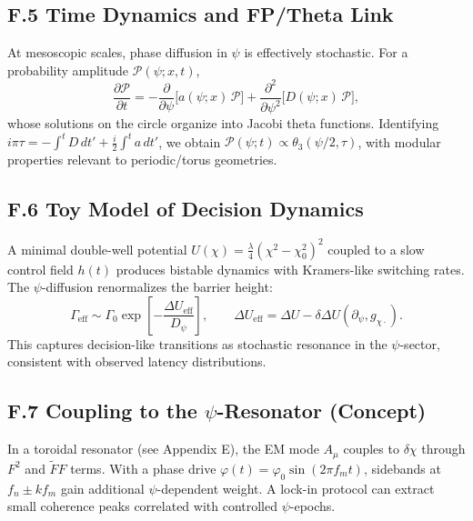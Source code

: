 \subsection*{F.5 Time Dynamics and FP/Theta Link}
At mesoscopic scales, phase diffusion in $\psi$ is effectively stochastic. For a probability amplitude $\mathcal{P}(\psi;x,t)$,
\begin{equation}
\frac{\partial \mathcal{P}}{\partial t} = -\frac{\partial}{\partial \psi}\!\big[a(\psi;x)\,\mathcal{P}\big] + \frac{\partial^2}{\partial \psi^2}\!\big[D(\psi;x)\,\mathcal{P}\big],
\end{equation}
whose solutions on the circle organize into Jacobi theta functions. Identifying $i\pi\tau = -\int^t D\,dt' + \tfrac{i}{2}\!\int^t a\,dt'$, we obtain $\mathcal{P}(\psi;t)\propto \theta_3(\psi/2,\tau)$, with modular properties relevant to periodic/torus geometries.

\subsection*{F.6 Toy Model of Decision Dynamics}
A minimal double-well potential $U(\chi)=\tfrac{\lambda}{4}(\chi^2-\chi_0^2)^2$ coupled to a slow control field $h(t)$ produces bistable dynamics with Kramers-like switching rates. The $\psi$-diffusion renormalizes the barrier height:
\begin{equation}
\Gamma_{\mathrm{eff}} \sim \Gamma_0 \exp\!\left[-\frac{\Delta U_{\mathrm{eff}}}{D_\psi}\right],\qquad \Delta U_{\mathrm{eff}}=\Delta U - \delta\Delta U(\partial_\psi, g_{\chi\cdot}).
\end{equation}
This captures decision-like transitions as stochastic resonance in the $\psi$-sector, consistent with observed latency distributions.

\subsection*{F.7 Coupling to the $\psi$-Resonator (Concept)}
In a toroidal resonator (see Appendix E), the EM mode $A_\mu$ couples to $\delta\chi$ through $F^2$ and $\tilde F F$ terms. With a phase drive $\varphi(t)=\varphi_0\sin(2\pi f_m t)$, sidebands at $f_n\pm k f_m$ gain additional $\psi$-dependent weight. A lock-in protocol can extract small coherence peaks correlated with controlled $\psi$-epochs.


